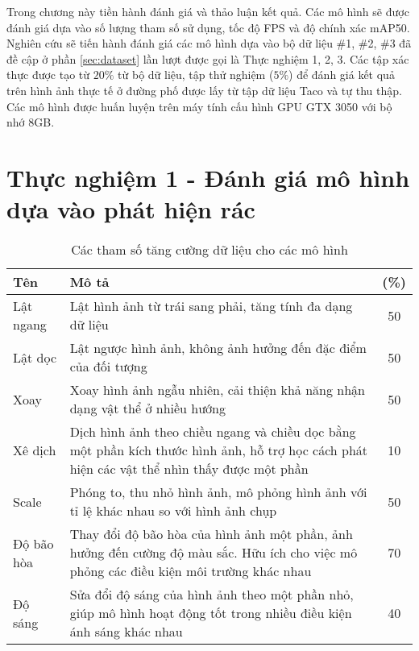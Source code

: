 \documentclass[../the.tex]{subfiles}
\begin{document}
{\fontsize{13}{12} \selectfont
Trong chương này tiền hành đánh giá và thảo luận kết quả. Các mô hình sẽ được đánh giá dựa vào số lượng tham số sử dụng, tốc độ FPS và độ chính xác mAP50.
Nghiên cứu sẽ tiến hành đánh giá các mô hình dựa vào bộ dữ liệu \#1, \#2, \#3 đã đề cập ở phần \ref{sec:dataset} lần lượt được gọi là Thực nghiệm 1, 2, 3.
Các tập xác thực được tạo từ $20\%$ từ bộ dữ liệu, tập thử nghiệm ($5\%$) để đánh giá kết quả trên hình ảnh thực tế ở đường phố được lấy từ tập dữ liệu Taco và tự thu thập.
Các mô hình được huấn luyện trên máy tính cấu hình GPU GTX 3050 với bộ nhớ 8GB.
}

\section{Thực nghiệm 1 - Đánh giá mô hình dựa vào phát hiện rác}
\begin{table}[ht!]
    \centering
    \caption{Các tham số tăng cường dữ liệu cho các mô hình}
    \begin{tabular}{|l|p{7cm}|c|}
        \hline
        \textbf{Tên}
                   & \textbf{Mô tả}
                   & \textbf{(\%)}
        \\ \hline
        Lật ngang  & Lật hình ảnh từ trái sang phải, tăng tính đa dạng dữ liệu                                                                                    & 50 \\  \hline
        Lật dọc    & Lật ngược hình ảnh, không ảnh hưởng đến đặc điểm của đối tượng                                                                               & 50 \\  \hline
        Xoay       & Xoay hình ảnh ngẫu nhiên, cải thiện khả năng nhận dạng vật thể ở nhiều hướng                                                                 & 50 \\  \hline
        Xê dịch    & Dịch hình ảnh theo chiều ngang và chiều dọc bằng một phần kích thước hình ảnh, hỗ trợ học cách phát hiện các vật thể nhìn thấy được một phần & 10 \\  \hline
        Scale      & Phóng to, thu nhỏ hình ảnh, mô phỏng hình ảnh với tỉ lệ khác nhau so với hình ảnh chụp                                                       & 50 \\  \hline
        Độ bão hòa & Thay đổi độ bão hòa của hình ảnh một phần, ảnh hưởng đến cường độ màu sắc. Hữu ích cho việc mô phỏng các điều kiện môi trường khác nhau      & 70 \\ \hline
        Độ sáng    & Sửa đổi độ sáng của hình ảnh theo một phần nhỏ, giúp mô hình hoạt động tốt trong nhiều điều kiện ánh sáng khác nhau                          & 40 \\ \hline
    \end{tabular}
    \label{tab:thamso}
\end{table}
\end{document}
